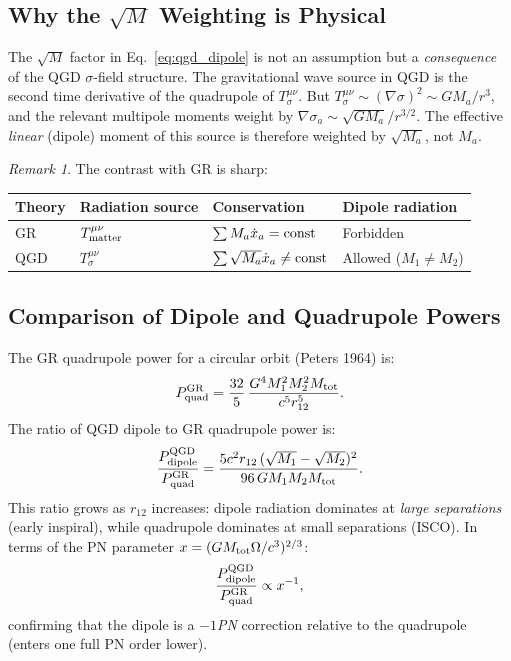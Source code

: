 \documentclass[11pt,a4paper]{article}
\theoremstyle{definition}
\theoremstyle{remark}
\newtheorem{remark}{Remark}[section]
\begin{document}
	\subsection{Why the $\sqrt{M}$ Weighting is Physical}
	
	The $\sqrt{M}$ factor in Eq.~\eqref{eq:qgd_dipole} is not an assumption
	but a \emph{consequence} of the QGD $\sigma$-field structure.
	The gravitational wave source in QGD is the second time derivative of
	the quadrupole of $T^{\mu\nu}_\sigma$.  But
	$T^{\mu\nu}_\sigma\sim(\nabla\sigma)^2\sim GM_a/r^3$, and the relevant
	multipole moments weight by $\nabla\sigma_a\sim\sqrt{GM_a}/r^{3/2}$.
	The effective \emph{linear} (dipole) moment of this source is therefore
	weighted by $\sqrt{M_a}$, not $M_a$.
	
	\begin{remark}
		The contrast with GR is sharp:
		\begin{center}
			\renewcommand{\arraystretch}{1.4}
			\begin{tabular}{llll}
				\toprule
				Theory & Radiation source & Conservation & Dipole radiation \\
				\midrule
				GR  & $T^{\mu\nu}_{\rm matter}$ & $\sum M_a\dot{x}_a={\rm const}$ & Forbidden \\
				QGD & $T^{\mu\nu}_\sigma$ & $\sum\sqrt{M_a}\dot{x}_a\neq{\rm const}$ & Allowed ($M_1\neq M_2$) \\
				\bottomrule
			\end{tabular}
		\end{center}
	\end{remark}
	
	\subsection{Comparison of Dipole and Quadrupole Powers}
	
	The GR quadrupole power for a circular orbit (Peters 1964) is:
	\begin{equation}
		P_{\rm quad}^{\rm GR}
		= \frac{32}{5}\,\frac{G^4 M_1^2 M_2^2 M_{\rm tot}}{c^5 r_{12}^5}.
		\label{eq:quad_power_gr}
	\end{equation}
	The ratio of QGD dipole to GR quadrupole power is:
	\begin{equation}
		\frac{P_{\rm dipole}^{\rm QGD}}{P_{\rm quad}^{\rm GR}}
		= \frac{5c^2 r_{12}\,(\sqrt{M_1}-\sqrt{M_2})^2}{96\,G M_1 M_2 M_{\rm tot}}.
		\label{eq:power_ratio}
	\end{equation}
	This ratio grows as $r_{12}$ increases: dipole radiation dominates at
	\emph{large separations} (early inspiral), while quadrupole dominates
	at small separations (ISCO).  In terms of the PN parameter
	$x=(GM_{\rm tot}\Omega/c^3)^{2/3}$:
	\begin{equation}
		\frac{P_{\rm dipole}^{\rm QGD}}{P_{\rm quad}^{\rm GR}}
		\propto x^{-1},
		\label{eq:ratio_pn}
	\end{equation}
	confirming that the dipole is a \emph{$-1$PN} correction relative to
	the quadrupole (enters one full PN order lower).
	
\end{document}

